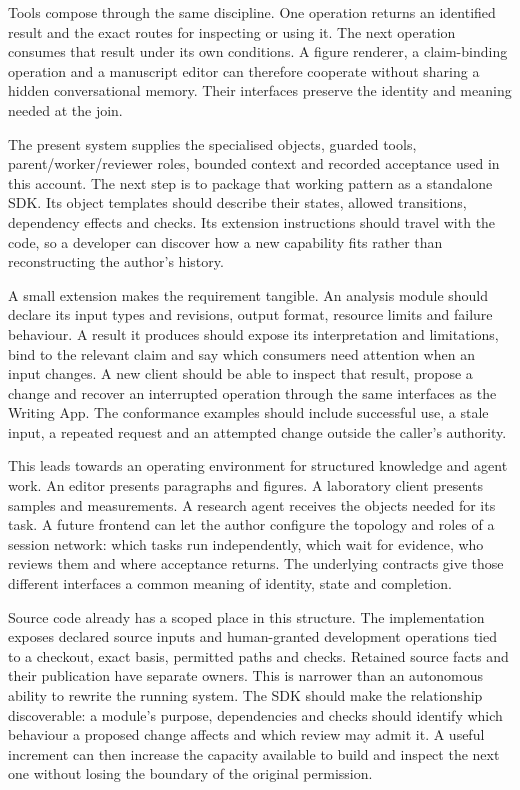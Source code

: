 Tools compose through the same discipline. One operation returns an identified result and the exact routes for inspecting or using it. The next operation consumes that result under its own conditions. A figure renderer, a claim-binding operation and a manuscript editor can therefore cooperate without sharing a hidden conversational memory. Their interfaces preserve the identity and meaning needed at the join.

The present system supplies the specialised objects, guarded tools, parent/worker/reviewer roles, bounded context and recorded acceptance used in this account. The next step is to package that working pattern as a standalone SDK. Its object templates should describe their states, allowed transitions, dependency effects and checks. Its extension instructions should travel with the code, so a developer can discover how a new capability fits rather than reconstructing the author's history.

A small extension makes the requirement tangible. An analysis module should declare its input types and revisions, output format, resource limits and failure behaviour. A result it produces should expose its interpretation and limitations, bind to the relevant claim and say which consumers need attention when an input changes. A new client should be able to inspect that result, propose a change and recover an interrupted operation through the same interfaces as the Writing App. The conformance examples should include successful use, a stale input, a repeated request and an attempted change outside the caller's authority.

This leads towards an operating environment for structured knowledge and agent work. An editor presents paragraphs and figures. A laboratory client presents samples and measurements. A research agent receives the objects needed for its task. A future frontend can let the author configure the topology and roles of a session network: which tasks run independently, which wait for evidence, who reviews them and where acceptance returns. The underlying contracts give those different interfaces a common meaning of identity, state and completion.

Source code already has a scoped place in this structure. The implementation exposes declared source inputs and human-granted development operations tied to a checkout, exact basis, permitted paths and checks. Retained source facts and their publication have separate owners. This is narrower than an autonomous ability to rewrite the running system. The SDK should make the relationship discoverable: a module's purpose, dependencies and checks should identify which behaviour a proposed change affects and which review may admit it. A useful increment can then increase the capacity available to build and inspect the next one without losing the boundary of the original permission.

